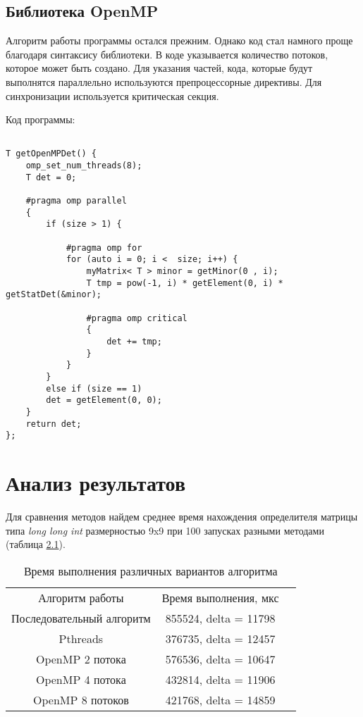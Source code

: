 \documentclass[10pt,a4paper]{report}
\begin{document}
	\section{Библиотека OpenMP}
	
	Алгоритм работы программы остался прежним. Однако код стал намного проще благодаря синтаксису библиотеки. В коде указывается количество потоков, которое может быть создано. Для указания частей, кода, которые будут выполнятся параллельно используются препроцессорные директивы. Для синхронизации используется критическая секция.
		
	Код программы:
	
	\begin{lstlisting}
	
T getOpenMPDet() {     
   	omp_set_num_threads(8);        
   	T det = 0;
   	
   	#pragma omp parallel
   	{
   		if (size > 1) {
   			
   			#pragma omp for
   			for (auto i = 0; i <  size; i++) {
   				myMatrix< T > minor = getMinor(0 , i);
   				T tmp = pow(-1, i) * getElement(0, i) * getStatDet(&minor);
   				
   				#pragma omp critical 
   				{
   					det += tmp;
   				}
   			}
   		}
   		else if (size == 1)
   		det = getElement(0, 0);
   	}
   	return det;
};    
\end{lstlisting}	
	
	\chapter{Анализ результатов}
	
	Для сравнения методов найдем среднее время нахождения определителя матрицы типа \textit{long long int} размерностью 9x9 при 100 запусках разными методами (таблица \ref{tabular:timesandtenses}).
		
	\begin{table}[h!]
	\begin{center}
		\begin{tabular}{ccc}
			Алгоритм работы 	& Время выполнения, мкс\\
			Последовательный алгоритм & 855524, delta = 11798\\
			Pthreads 			& 		376735, delta = 12457\\
			OpenMP 2 потока 	&  		576536, delta = 10647\\
			OpenMP 4 потока 	&  		432814, delta = 11906\\
			OpenMP 8 потоков 	& 		421768, delta = 14859\\
		\end{tabular}
	\end{center}
	\caption{Время выполнения различных вариантов алгоритма}
	\label{tabular:timesandtenses}
	\end{table}
	
\end{document}
